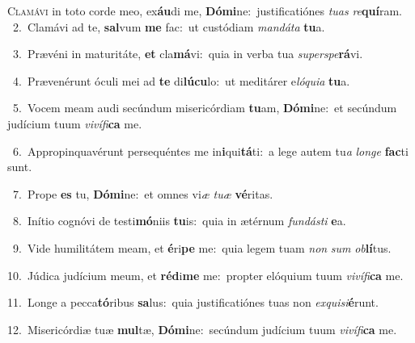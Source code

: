 \lettrine{\initial\textcolor{\initialcolor}{C}}{lamávi} in toto corde meo, ex\-\textbf{áu}\-di me, \textbf{Dó}\-\textbf{mi}ne:~\star justificatiónes \textit{tu}\-\textit{as} \textit{re}\-\textbf{quí}ram.\\
{\numbfont\textcolor{\numbcolor}{~2.}}~Clamávi ad te, \textbf{sal}\-vum \textbf{me} fac:~\star ut custódiam \textit{man}\-\textit{dá}\textit{ta} \textbf{tu}\-a.\par
{\numbfont\textcolor{\numbcolor}{~3.}}~Prævéni in maturitáte, \textbf{et} cla\-\textbf{má}\-vi:~\star quia in verba tua \textit{su}\-\textit{per}\textit{spe}\textbf{rá}vi.\par
{\numbfont\textcolor{\numbcolor}{~4.}}~Prævenérunt óculi mei ad \textbf{te} di\-\textbf{lú}\-\textbf{cu}lo:~\star ut meditárer e\-\textit{ló}\-\textit{qui}\textit{a} \textbf{tu}\-a.\par
{\numbfont\textcolor{\numbcolor}{~5.}}~Vocem meam audi secúndum misericórdiam \textbf{tu}\-am, \textbf{Dó}\-\textbf{mi}ne:~\star et secúndum judícium tuum \textit{vi}\-\textit{ví}\textit{fi}\textbf{ca} me.\par
{\numbfont\textcolor{\numbcolor}{~6.}}~Appropinquavérunt persequéntes me in\-\textbf{i}\-qui\-\textbf{tá}\-ti:~\star a lege autem tu\textit{a} \textit{lon}\-\textit{ge} \textbf{fac}\-ti sunt.\par
{\numbfont\textcolor{\numbcolor}{~7.}}~Prope \textbf{es} tu, \textbf{Dó}\-\textbf{mi}ne:~\star et omnes vi\textit{æ} \textit{tu}\-\textit{æ} \textbf{vé}\-ritas.\par
{\numbfont\textcolor{\numbcolor}{~8.}}~Inítio cognóvi de testi\-\textbf{mó}\-niis \textbf{tu}\-is:~\star quia in ætérnum \textit{fun}\-\textit{dás}\textit{ti} \textbf{e}\-a.\par
{\numbfont\textcolor{\numbcolor}{~9.}}~Vide humilitátem meam, et \textbf{é}\-ri\textbf{pe} me:~\star quia legem tuam \textit{non} \textit{sum} \textit{ob}\-\textbf{lí}tus.\par
{\numbfont\textcolor{\numbcolor}{10.}}~Júdica judícium meum, et \textbf{réd}\-i\textbf{me} me:~\star propter elóquium tuum \textit{vi}\-\textit{ví}\textit{fi}\textbf{ca} me.\par
{\numbfont\textcolor{\numbcolor}{11.}}~Longe a pecca\-\textbf{tó}\-ribus \textbf{sa}\-lus:~\star quia justificatiónes tuas non \textit{ex}\-\textit{qui}\textit{si}\textbf{é}runt.\par
{\numbfont\textcolor{\numbcolor}{12.}}~Misericórdiæ tuæ \textbf{mul}\-tæ, \textbf{Dó}\-\textbf{mi}ne:~\star secúndum judícium tuum \textit{vi}\-\textit{ví}\textit{fi}\textbf{ca} me.\par
